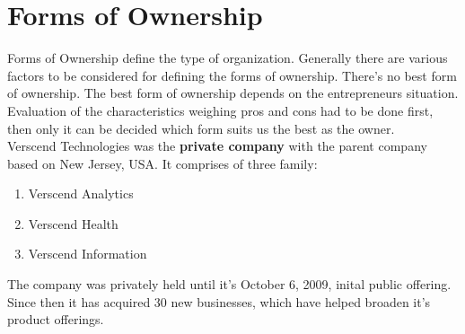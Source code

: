 \section{Forms of Ownership}
Forms of Ownership define the type of organization. Generally there are various factors to be considered for defining the forms of ownership. There's no best form of ownership. The best form of ownership depends on the entrepreneurs situation. Evaluation of the characteristics weighing pros and cons had to be done first, then only it can be decided which form suits us the best as the owner.\\
Verscend Technologies was the \textbf{private company} with the parent company based on New Jersey, USA. It comprises of three family:
\begin{enumerate}
\item Verscend Analytics
\item Verscend Health
\item Verscend Information
\end{enumerate}
The company was privately held until it's October 6, 2009, inital public offering. Since then it has acquired 30 new businesses, which have helped broaden it's product offerings.
\cleardoublepage
